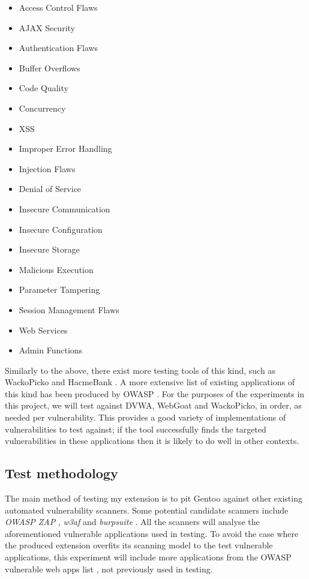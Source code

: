 \begin{multicols}{3}
	\begin{itemize}
		\item 	Access Control Flaws
		\item 	AJAX Security
		\item 	Authentication Flaws
		\item 	Buffer Overflows
		\item 	Code Quality
		\item 	Concurrency
		\item 	XSS
		\item 	Improper Error Handling
		\item 	Injection Flaws
		\item 	Denial of Service
		\item 	Insecure Communication
		\item 	Insecure Configuration
		\item 	Insecure Storage
		\item 	Malicious Execution
		\item 	Parameter Tampering
		\item 	Session Management Flaws
		\item 	Web Services
		\item 	Admin Functions
	\end{itemize}
\end{multicols}

Similarly to the above, there exist more testing tools of this kind, such as WackoPicko \cite{wackoPickoGithub} and HacmeBank \cite{hacmeBankMcAfee}. A more extensive list of existing applications of this kind has been produced by OWASP \cite{owaspVulnerableWebAppsList}. For the purposes of the experiments in this project, we will test against DVWA, WebGoat and WackoPicko, in order, as needed per vulnerability. This provides a good variety of implementations of vulnerabilities to test against; if the tool successfully finds the targeted vulnerabilities in these applications then it is likely to do well in other contexts.

\subsection{Test methodology}
The main method of testing my extension is to pit Gentoo against other existing automated vulnerability scanners. Some potential candidate scanners include \emph{OWASP ZAP} \cite{owaspZapPage}, \emph{w3af} \cite{w3af} and \emph{burpsuite} \cite{burpSuitePage}. All the scanners will analyse the aforementioned vulnerable applications used in testing. To avoid the case where the produced extension overfits its scanning model to the test vulnerable applications, this experiment will include more applications from the OWASP vulnerable web apps list \cite{owaspVulnerableWebAppsList}, not previously used in testing. \\

